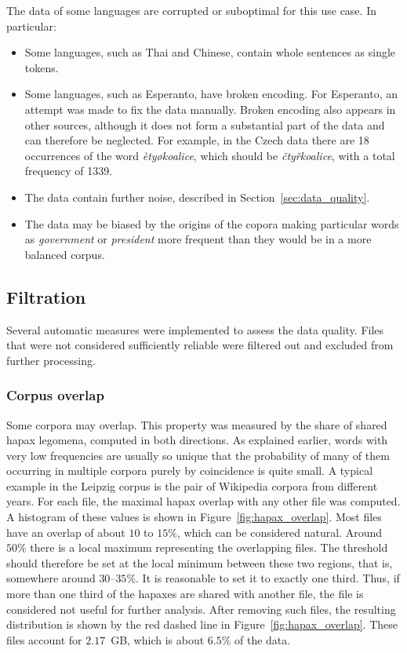 The data of some languages are corrupted or suboptimal for this use case. In particular:
\begin{itemize}
    \item Some languages, such as Thai and Chinese, contain whole sentences as single tokens.
    \item Some languages, such as Esperanto, have broken encoding. For Esperanto, an attempt was made to fix the data manually. Broken encoding also appears in other sources, although it does not form a substantial part of the data and can therefore be neglected. For example, in the Czech data there are 18 occurrences of the word \textit{ètyøkoalice}, which should be \textit{čtyřkoalice}, with a total frequency of 1339.
    \item The data contain further noise, described in Section~\ref{sec:data_quality}.
    \item The data may be biased by the origins of the copora making particular words as \textit{government} or \textit{president} more frequent than they would be in a more balanced corpus.
\end{itemize}

\subsection{Filtration}
\label{sec:filtration}

Several automatic measures were implemented to assess the data quality. Files that were not considered sufficiently reliable were filtered out and excluded from further processing.

\subsubsection{Corpus overlap}

Some corpora may overlap. This property was measured by the share of shared hapax legomena, computed in both directions. As explained earlier, words with very low frequencies are usually so unique that the probability of many of them occurring in multiple corpora purely by coincidence is quite small. A typical example in the Leipzig corpus is the pair of Wikipedia corpora from different years. For each file, the maximal hapax overlap with any other file was computed. A histogram of these values is shown in Figure~\ref{fig:hapax_overlap}. Most files have an overlap of about $10$ to $15\%$, which can be considered natural. Around $50\%$ there is a local maximum representing the overlapping files. The threshold should therefore be set at the local minimum between these two regions, that is, somewhere around $30\text{--}35\%$. It is reasonable to set it to exactly one third. Thus, if more than one third of the hapaxes are shared with another file, the file is considered not useful for further analysis. After removing such files, the resulting distribution is shown by the red dashed line in Figure~\ref{fig:hapax_overlap}. These files account for $2.17$~GB, which is about $6.5\%$ of the data.

